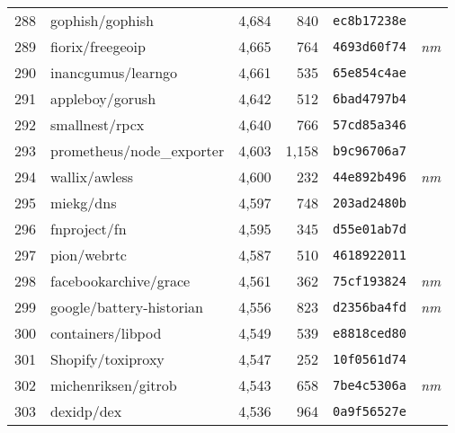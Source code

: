 {\begin{supertabular}{llrrll}
        288 &                    gophish/gophish &  4,684 &    840 &  \texttt{ec8b17238e} &              \\
        289 &                   fiorix/freegeoip &  4,665 &    764 &  \texttt{4693d60f74} &  \textit{nm} \\
        290 &                 inancgumus/learngo &  4,661 &    535 &  \texttt{65e854c4ae} &              \\
        291 &                    appleboy/gorush &  4,642 &    512 &  \texttt{6bad4797b4} &              \\
        292 &                     smallnest/rpcx &  4,640 &    766 &  \texttt{57cd85a346} &              \\
        293 &          prometheus/node\_exporter &  4,603 &  1,158 &  \texttt{b9c96706a7} &              \\
        294 &                      wallix/awless &  4,600 &    232 &  \texttt{44e892b496} &  \textit{nm} \\
        295 &                          miekg/dns &  4,597 &    748 &  \texttt{203ad2480b} &              \\
        296 &                       fnproject/fn &  4,595 &    345 &  \texttt{d55e01ab7d} &              \\
        297 &                        pion/webrtc &  4,587 &    510 &  \texttt{4618922011} &              \\
        298 &              facebookarchive/grace &  4,561 &    362 &  \texttt{75cf193824} &  \textit{nm} \\
        299 &           google/battery-historian &  4,556 &    823 &  \texttt{d2356ba4fd} &  \textit{nm} \\
        300 &                  containers/libpod &  4,549 &    539 &  \texttt{e8818ced80} &              \\
        301 &                  Shopify/toxiproxy &  4,547 &    252 &  \texttt{10f0561d74} &              \\
        302 &                michenriksen/gitrob &  4,543 &    658 &  \texttt{7be4c5306a} &  \textit{nm} \\
        303 &                         dexidp/dex &  4,536 &    964 &  \texttt{0a9f56527e} &              \\

\end{supertabular}}
